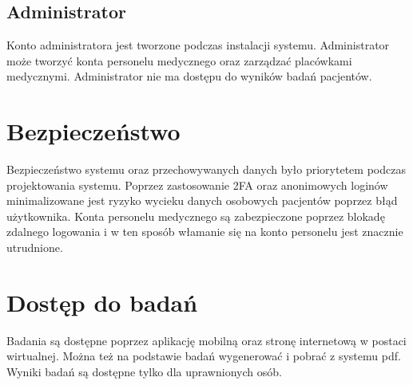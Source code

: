 \documentclass{documentation}
\begin{document}
\subsection{Administrator}

Konto administratora jest tworzone podczas instalacji systemu.
Administrator może tworzyć konta personelu medycznego oraz zarządzać placówkami medycznymi.
Administrator nie ma dostępu do wyników badań pacjentów.

\section{Bezpieczeństwo}

Bezpieczeństwo systemu oraz przechowywanych danych było priorytetem podczas projektowania systemu.
Poprzez zastosowanie 2FA oraz anonimowych loginów minimalizowane jest ryzyko wycieku danych osobowych pacjentów poprzez błąd użytkownika.
Konta personelu medycznego są zabezpieczone poprzez blokadę zdalnego logowania i w ten sposób włamanie się na konto personelu jest znacznie utrudnione.

\section{Dostęp do badań}

Badania są dostępne poprzez aplikację mobilną oraz stronę internetową w postaci wirtualnej.
Można też na podstawie badań wygenerować i pobrać z systemu pdf.
Wyniki badań są dostępne tylko dla uprawnionych osób.
\end{document}
